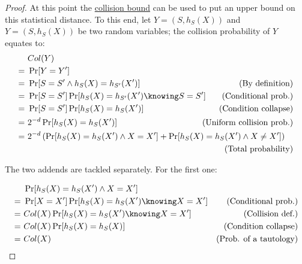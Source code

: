 \begin{proof}
    At this point the \hyperref[lem:colbound]{collision bound} can be used to put an upper bound on this statistical distance. To this end, let $Y = (S, h_S(X))$ and $Y = (S, h_S(X))$ be two \iid{} random variables; the collision probability of $Y$ equates to:
    \begin{align*}
         &\ Col(Y)                                               &                                               \\
        =&\ \Pr[Y = Y']                                          &                                               \\
        =&\ \Pr[S = S' \wedge h_S(X) = h_{S'}(X')]               & \mathllap{\text{(By definition)}}             \\
        =&\ \Pr[S = S'] \Pr[h_S(X) = h_{S'}(X') \knowing S = S'] & \mathllap{\text{(Conditional prob.)}}         \\
        =&\ \Pr[S = S'] \Pr[h_S(X) = h_S(X')]                    & \mathllap{\text{(Condition collapse)}}        \\
        =&\ 2^{-d} \Pr[h_S(X) = h_S(X')]                         & \mathllap{\text{(Uniform collision prob.)}}   \\
        =&\ 2^{-d} \left( \Pr[h_S(X) = h_S(X') \wedge X = X'] + \Pr[h_S(X) = h_S(X') \wedge X \neq X'] \right) & \\
         &                                                       & \mathllap{\text{(Total probability)}}         \\
    \end{align*}

    The two addends are tackled separately. For the first one: 

    \begin{align*}
         &\ \Pr[h_S(X) = h_S(X') \wedge X = X']               &                               \\
        =&\ \Pr[X = X'] \Pr[h_S(X) = h_S(X') \knowing X = X'] & \text{(Conditional prob.)}    \\
        =&\ Col(X) \Pr[h_S(X) = h_S(X') \knowing X = X']      & \text{(Collision def.)}       \\
        =&\ Col(X) \Pr[h_S(X) = h_S(X)]                       & \text{(Condition collapse)}   \\
        =&\ Col(X)                                            & \text{(Prob. of a tautology)} \\
    \end{align*}


\end{proof}
